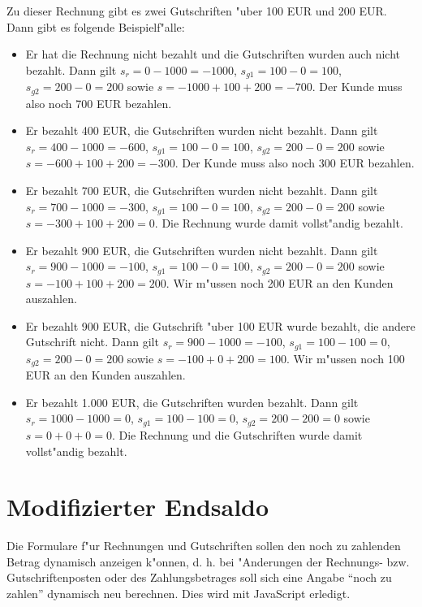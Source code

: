 \documentclass[a4paper]{article}
\numberwithin{equation}{section}
\begin{document}
\noindent Zu dieser Rechnung gibt es zwei Gutschriften "uber 100 EUR und 200
EUR. Dann gibt es folgende Beispielf"alle:
\begin{itemize}
  \item Er hat die Rechnung nicht bezahlt und die Gutschriften wurden auch nicht
    bezahlt. Dann gilt $s_r = 0 - 1000 = -1000$, $s_{g1} = 100 - 0 = 100$,
    $s_{g2} = 200 - 0 = 200$ sowie $s = -1000 + 100 + 200 = -700$. Der Kunde
    muss also noch 700 EUR bezahlen.
  \item Er bezahlt 400 EUR, die Gutschriften wurden nicht bezahlt. Dann gilt
    $s_r = 400 - 1000 = -600$, $s_{g1} = 100 - 0 = 100$, 
    $s_{g2} = 200 - 0 = 200$ sowie $s = -600 + 100 + 200 = -300$. Der Kunde muss
    also noch 300 EUR bezahlen.
  \item Er bezahlt 700 EUR, die Gutschriften wurden nicht bezahlt. Dann gilt
    $s_r = 700 - 1000 = -300$, $s_{g1} = 100 - 0 = 100$, 
    $s_{g2} = 200 - 0 = 200$ sowie $s = -300 + 100 + 200 = 0$. Die Rechnung
    wurde damit vollst"andig bezahlt.
  \item Er bezahlt 900 EUR, die Gutschriften wurden nicht bezahlt. Dann gilt
    $s_r = 900 - 1000 = -100$, $s_{g1} = 100 - 0 = 100$, 
    $s_{g2} = 200 - 0 = 200$ sowie $s = -100 + 100 + 200 = 200$. Wir m"ussen
    noch 200 EUR an den Kunden auszahlen.
  \item Er bezahlt 900 EUR, die Gutschrift "uber 100 EUR wurde bezahlt, die
    andere Gutschrift nicht. Dann gilt $s_r = 900 - 1000 = -100$, 
    $s_{g1} = 100 - 100 = 0$, $s_{g2} = 200 - 0 = 200$ sowie 
    $s = -100 + 0 + 200 = 100$. Wir m"ussen noch 100 EUR an den Kunden 
    auszahlen.
  \item Er bezahlt 1.000 EUR, die Gutschriften wurden bezahlt. Dann gilt 
    $s_r = 1000 - 1000 = 0$, $s_{g1} = 100 - 100 = 0$, $s_{g2} = 200 - 200 = 0$ 
    sowie $s = 0 + 0 + 0 = 0$. Die Rechnung und die Gutschriften wurde damit 
    vollst"andig bezahlt.
\end{itemize}



%
%
%
%
\section{Modifizierter Endsaldo}
Die Formulare f"ur Rechnungen und Gutschriften sollen den noch zu zahlenden
Betrag dynamisch anzeigen k"onnen, d. h. bei "Anderungen der Rechnungs- bzw.
Gutschriftenposten oder des Zahlungsbetrages soll sich eine Angabe "`noch zu
zahlen"' dynamisch neu berechnen. Dies wird mit JavaScript erledigt.
\end{document}
